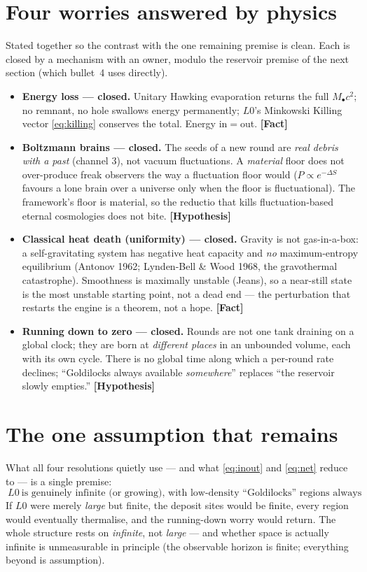 \documentclass[11pt]{article}
\newcommand{\Fact}{\textbf{\textcolor{green!45!black}{[Fact]}}}
\newcommand{\Hyp}{\textbf{\textcolor{blue!55!black}{[Hypothesis]}}}
\newcommand{\Mbh}{M_{\bullet}}
\begin{document}
\section{Four worries answered by physics}
Stated together so the contrast with the one remaining premise is clean. Each is closed by a mechanism with an owner, modulo the reservoir premise of the next section (which bullet~4 uses directly).
\begin{itemize}[leftmargin=1.35em,itemsep=3pt]
\item \textbf{Energy loss --- closed.} Unitary Hawking evaporation returns the full $\Mbh c^2$; no remnant, no hole swallows energy permanently; $L0$'s Minkowski Killing vector \eqref{eq:killing} conserves the total. Energy in$=$out. \Fact
\item \textbf{Boltzmann brains --- closed.} The seeds of a new round are \emph{real debris with a past} (channel 3), not vacuum fluctuations. A \emph{material} floor does not over-produce freak observers the way a fluctuation floor would ($P\!\propto\!e^{-\Delta S}$ favours a lone brain over a universe only when the floor is fluctuational). The framework's floor is material, so the reductio that kills fluctuation-based eternal cosmologies does not bite. \Hyp
\item \textbf{Classical heat death (uniformity) --- closed.} Gravity is not gas-in-a-box: a self-gravitating system has negative heat capacity and \emph{no} maximum-entropy equilibrium (Antonov 1962; Lynden-Bell \& Wood 1968, the gravothermal catastrophe). Smoothness is maximally unstable (Jeans), so a near-still state is the most unstable starting point, not a dead end --- the perturbation that restarts the engine is a theorem, not a hope. \Fact
\item \textbf{Running down to zero --- closed.} Rounds are not one tank draining on a global clock; they are born at \emph{different places} in an unbounded volume, each with its own cycle. There is no global time along which a per-round rate declines; ``Goldilocks always available \emph{somewhere}'' replaces ``the reservoir slowly empties.'' \Hyp
\end{itemize}

\section{The one assumption that remains}
What all four resolutions quietly use --- and what \eqref{eq:inout} and \eqref{eq:net} reduce to --- is a single premise:
\begin{equation}
\boxed{\ L0\ \text{is genuinely infinite (or growing), with low-density ``Goldilocks'' regions always remaining.}\ }
\end{equation}
If $L0$ were merely \emph{large} but finite, the deposit sites would be finite, every region would eventually thermalise, and the running-down worry would return. The whole structure rests on \emph{infinite}, not \emph{large} --- and whether space is actually infinite is unmeasurable in principle (the observable horizon is finite; everything beyond is assumption).
\end{document}
